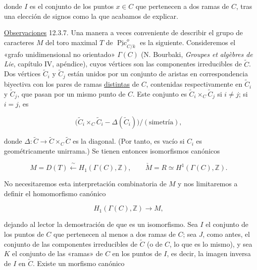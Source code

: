 \noindent
donde $I$ es el conjunto de los puntos $x\in C$ que pertenecen a dos
ramas de $C$, tras una elección de signos como la que acabamos de
explicar.

\medskip
\noindent
\underline{Observaciones} 12.3.7. Una manera a veces conveniente de
describir el grupo de caracteres $M$ del toro maximal $T$ de
$\underline{\operatorname{Pic}}^o_{C/k}$ es la siguiente. Consideremos
el «grafo unidimensional no orientado» $\Gamma(C)$ (N. Bourbaki,
\emph{Groupes et algèbres de Lie}, capítulo IV, apéndice), cuyos vértices
son las componentes irreducibles de $\widetilde C$. Dos vértices
$\widetilde C_i$ y $\widetilde C_j$ están unidos por un conjunto de
aristas en correspondencia biyectiva con los pares de ramas
\underline{distintas} de $C$, contenidas respectivamente en
$\widetilde C_i$ y $\widetilde C_j$, que pasan por un mismo punto de $C$.
Este conjunto es $\widetilde C_i\times_C\widetilde C_j$ si $i\ne j$;
si $i=j$, es

\begin{equation*}
 \bigl(\widetilde C_i\times_C\widetilde C_i-
       \Delta(\widetilde C_i)\bigr)/(\text{simetría}),
\end{equation*}

\noindent
donde $\Delta:\widetilde C\to\widetilde C\times_C\widetilde C$ es la
diagonal. (Por tanto, es vacío si $C_i$ es geométricamente unirrama.) Se
tienen entonces isomorfismos canónicos

\begin{equation}\tag{12.3.7}
 M=D(T)\xleftarrow{\ \sim\ }H_1(\Gamma(C),\mathbb Z),
 \qquad
 \check M=R\simeq H^1(\Gamma(C),\mathbb Z).
\end{equation}

No necesitaremos esta interpretación combinatoria de $M$ y nos
limitaremos a definir el homomorfismo canónico

\begin{equation}\tag{12.3.8}
 H_1(\Gamma(C),\mathbb Z)\longrightarrow M,
\end{equation}

\noindent
dejando al lector la demostración de que es un isomorfismo. Sea $I$ el
conjunto de los puntos de $C$ que pertenecen al menos a dos ramas de
$C$; sea $J$, como antes, el conjunto de las componentes irreducibles de
$\widetilde C$ (o de $C$, lo que es lo mismo), y sea $K$ el conjunto de
las «ramas» de $C$ en los puntos de $I$, es decir, la imagen inversa de
$I$ en $\widetilde C$. Existe un morfismo canónico


